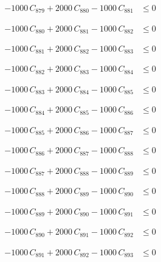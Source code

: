 \documentclass[a4paper,11pt]{article}
\begin{document}
\begin{align}
-1000\,C_{879} + 2000\,C_{880} - 1000\,C_{881} &\leq 0 \nonumber
\end{align}

\begin{align}
-1000\,C_{880} + 2000\,C_{881} - 1000\,C_{882} &\leq 0 \nonumber
\end{align}

\begin{align}
-1000\,C_{881} + 2000\,C_{882} - 1000\,C_{883} &\leq 0 \nonumber
\end{align}

\begin{align}
-1000\,C_{882} + 2000\,C_{883} - 1000\,C_{884} &\leq 0 \nonumber
\end{align}

\begin{align}
-1000\,C_{883} + 2000\,C_{884} - 1000\,C_{885} &\leq 0 \nonumber
\end{align}

\begin{align}
-1000\,C_{884} + 2000\,C_{885} - 1000\,C_{886} &\leq 0 \nonumber
\end{align}

\begin{align}
-1000\,C_{885} + 2000\,C_{886} - 1000\,C_{887} &\leq 0 \nonumber
\end{align}

\begin{align}
-1000\,C_{886} + 2000\,C_{887} - 1000\,C_{888} &\leq 0 \nonumber
\end{align}

\begin{align}
-1000\,C_{887} + 2000\,C_{888} - 1000\,C_{889} &\leq 0 \nonumber
\end{align}

\begin{align}
-1000\,C_{888} + 2000\,C_{889} - 1000\,C_{890} &\leq 0 \nonumber
\end{align}

\begin{align}
-1000\,C_{889} + 2000\,C_{890} - 1000\,C_{891} &\leq 0 \nonumber
\end{align}

\begin{align}
-1000\,C_{890} + 2000\,C_{891} - 1000\,C_{892} &\leq 0 \nonumber
\end{align}

\begin{align}
-1000\,C_{891} + 2000\,C_{892} - 1000\,C_{893} &\leq 0 \nonumber
\end{align}
\end{document}
